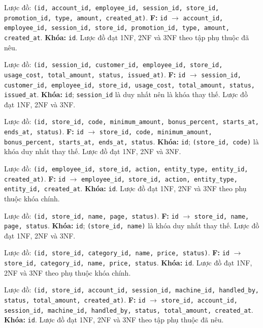 \begin{description}[leftmargin=4.1cm,labelwidth=3.9cm,style=nextline]
  \item[8. \texttt{account\_transactions}] Lược đồ: \texttt{(id, account\_id, employee\_id, session\_id, store\_id, promotion\_id, type, amount, created\_at)}. \textbf{F:} \texttt{id} $\rightarrow$ \texttt{account\_id, employee\_id, session\_id, store\_id, promotion\_id, type, amount, created\_at}. \textbf{Khóa:} \texttt{id}. Lược đồ đạt 1NF, 2NF và 3NF theo tập phụ thuộc đã nêu.
  \item[9. \texttt{invoices}] Lược đồ: \texttt{(id, session\_id, customer\_id, employee\_id, store\_id, usage\_cost, total\_amount, status, issued\_at)}. \textbf{F:} \texttt{id} $\rightarrow$ \texttt{session\_id, customer\_id, employee\_id, store\_id, usage\_cost, total\_amount, status, issued\_at}. \textbf{Khóa:} \texttt{id}; \texttt{session\_id} là duy nhất nên là khóa thay thế. Lược đồ đạt 1NF, 2NF và 3NF.
  \item[10. \texttt{promotions}] Lược đồ: \texttt{(id, store\_id, code, minimum\_amount, bonus\_percent, starts\_at, ends\_at, status)}. \textbf{F:} \texttt{id} $\rightarrow$ \texttt{store\_id, code, minimum\_amount, bonus\_percent, starts\_at, ends\_at, status}. \textbf{Khóa:} \texttt{id}; \texttt{(store\_id, code)} là khóa duy nhất thay thế. Lược đồ đạt 1NF, 2NF và 3NF.
  \item[11. \texttt{management\_audit}] Lược đồ: \texttt{(id, employee\_id, store\_id, action, entity\_type, entity\_id, created\_at)}. \textbf{F:} \texttt{id} $\rightarrow$ \texttt{employee\_id, store\_id, action, entity\_type, entity\_id, created\_at}. \textbf{Khóa:} \texttt{id}. Lược đồ đạt 1NF, 2NF và 3NF theo phụ thuộc khóa chính.
  \item[12. \texttt{menu\_categories}] Lược đồ: \texttt{(id, store\_id, name, page, status)}. \textbf{F:} \texttt{id} $\rightarrow$ \texttt{store\_id, name, page, status}. \textbf{Khóa:} \texttt{id}; \texttt{(store\_id, name)} là khóa duy nhất thay thế. Lược đồ đạt 1NF, 2NF và 3NF.
  \item[13. \texttt{menu\_items}] Lược đồ: \texttt{(id, store\_id, category\_id, name, price, status)}. \textbf{F:} \texttt{id} $\rightarrow$ \texttt{store\_id, category\_id, name, price, status}. \textbf{Khóa:} \texttt{id}. Lược đồ đạt 1NF, 2NF và 3NF theo phụ thuộc khóa chính.
  \item[14. \texttt{menu\_orders}] Lược đồ: \texttt{(id, store\_id, account\_id, session\_id, machine\_id, handled\_by, status, total\_amount, created\_at)}. \textbf{F:} \texttt{id} $\rightarrow$ \texttt{store\_id, account\_id, session\_id, machine\_id, handled\_by, status, total\_amount, created\_at}. \textbf{Khóa:} \texttt{id}. Lược đồ đạt 1NF, 2NF và 3NF theo tập phụ thuộc đã nêu.

\end{description}
